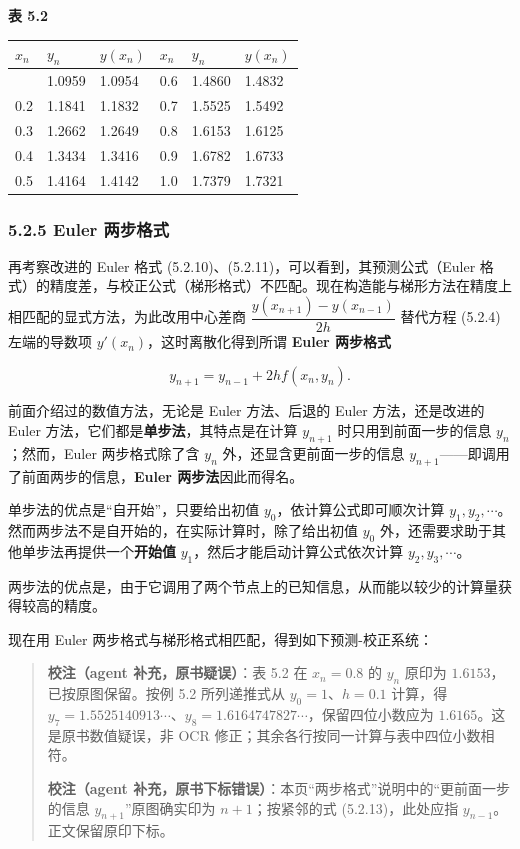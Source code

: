 \textbf{表 5.2}

{\def\LTcaptype{none} %
\begin{longtable}[]{@{}llllll@{}}
\toprule\noalign{}
\(x_n\) & \(y_n\) & \(y(x_n)\) & \(x_n\) & \(y_n\) & \(y(x_n)\) \\
\midrule\noalign{}
\endhead
\bottomrule\noalign{}
\endlastfoot
0.1 & 1.0959 & 1.0954 & 0.6 & 1.4860 & 1.4832 \\
0.2 & 1.1841 & 1.1832 & 0.7 & 1.5525 & 1.5492 \\
0.3 & 1.2662 & 1.2649 & 0.8 & 1.6153 & 1.6125 \\
0.4 & 1.3434 & 1.3416 & 0.9 & 1.6782 & 1.6733 \\
0.5 & 1.4164 & 1.4142 & 1.0 & 1.7379 & 1.7321 \\
\end{longtable}
}

\subsubsection{5.2.5 Euler 两步格式}\label{ch05a-euler-ux4e24ux6b65ux683cux5f0f}

再考察改进的 Euler 格式 (5.2.10)、(5.2.11)，可以看到，其预测公式（Euler 格式）的精度差，与校正公式（梯形格式）不匹配。现在构造能与梯形方法在精度上相匹配的显式方法，为此改用中心差商 \(\dfrac{y(x_{n+1})-y(x_{n-1})}{2h}\) 替代方程 (5.2.4) 左端的导数项 \(y'(x_n)\)，这时离散化得到所谓 \textbf{Euler 两步格式}

\[
y_{n+1}=y_{n-1}+2hf(x_n,y_n).\tag{5.2.13}
\]

前面介绍过的数值方法，无论是 Euler 方法、后退的 Euler 方法，还是改进的 Euler 方法，它们都是\textbf{单步法}，其特点是在计算 \(y_{n+1}\) 时只用到前面一步的信息 \(y_n\)；然而，Euler 两步格式除了含 \(y_n\) 外，还显含更前面一步的信息 \(y_{n+1}\)------即调用了前面两步的信息，\textbf{Euler 两步法}因此而得名。

单步法的优点是``自开始''，只要给出初值 \(y_0\)，依计算公式即可顺次计算 \(y_1,y_2,\cdots\)。然而两步法不是自开始的，在实际计算时，除了给出初值 \(y_0\) 外，还需要求助于其他单步法再提供一个\textbf{开始值} \(y_1\)，然后才能启动计算公式依次计算 \(y_2,y_3,\cdots\)。

两步法的优点是，由于它调用了两个节点上的已知信息，从而能以较少的计算量获得较高的精度。

现在用 Euler 两步格式与梯形格式相匹配，得到如下预测-校正系统：

\begin{quote}
\textbf{校注（agent 补充，原书疑误）}：表 5.2 在 \(x_n=0.8\) 的 \(y_n\) 原印为 \(1.6153\)，已按原图保留。按例 5.2 所列递推式从 \(y_0=1\)、\(h=0.1\) 计算，得 \(y_7=1.5525140913\cdots\)、\(y_8=1.6164747827\cdots\)，保留四位小数应为 \(1.6165\)。这是原书数值疑误，非 OCR 修正；其余各行按同一计算与表中四位小数相符。

\textbf{校注（agent 补充，原书下标错误）}：本页``两步格式''说明中的``更前面一步的信息 \(y_{n+1}\)''原图确实印为 \(n+1\)；按紧邻的式 (5.2.13)，此处应指 \(y_{n-1}\)。正文保留原印下标。
\end{quote}

